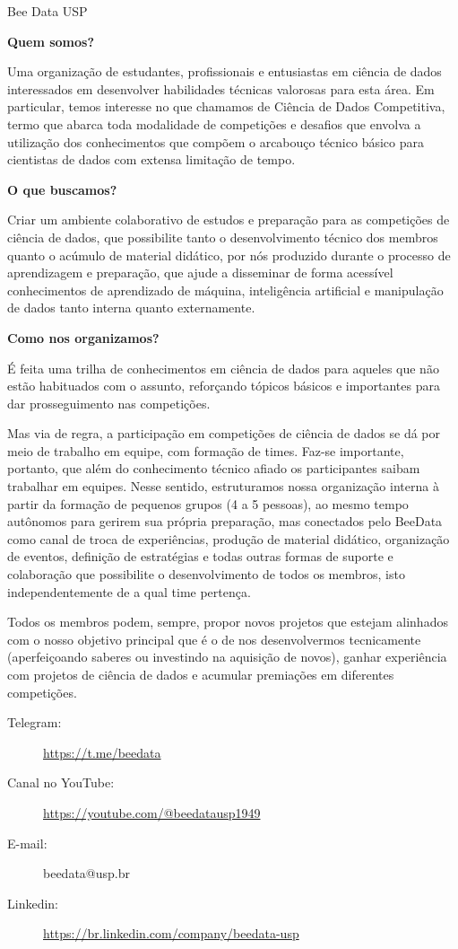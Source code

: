 \begin{subsecao}{Bee Data USP}


\textbf{Quem somos?}

Uma organização de estudantes, profissionais e entusiastas em ciência
de dados interessados em desenvolver habilidades técnicas valorosas para
esta área. Em particular, temos interesse no que chamamos de Ciência de
Dados Competitiva, termo que abarca toda modalidade de competições e desafios
que envolva a utilização dos conhecimentos que compõem o arcabouço técnico
básico para cientistas de dados com extensa limitação de tempo.

\textbf{O que buscamos?}

Criar um ambiente colaborativo de estudos e preparação para as competições de
ciência de dados, que possibilite tanto o desenvolvimento técnico dos membros
quanto o acúmulo de material didático, por nós produzido durante o processo de
aprendizagem e preparação, que ajude a disseminar de forma acessível conhecimentos
de aprendizado de máquina, inteligência artificial e manipulação de dados tanto
interna quanto externamente.

\textbf{Como nos organizamos?}

É feita uma trilha de conhecimentos em ciência de dados para aqueles que não
estão habituados com o assunto, reforçando tópicos básicos e importantes para dar
prosseguimento nas competições.

Mas via de regra, a participação em competições de ciência de dados se dá por meio
de trabalho em equipe, com formação de times. Faz-se importante, portanto, que
além do conhecimento técnico afiado os participantes saibam trabalhar em equipes.
Nesse sentido, estruturamos nossa organização interna à partir da formação de
pequenos grupos (4 a 5 pessoas), ao mesmo tempo autônomos para gerirem sua própria
preparação, mas conectados pelo BeeData como canal de troca de experiências, produção
de material didático, organização de eventos, definição de estratégias e todas outras
formas de suporte e colaboração que possibilite o desenvolvimento de todos os membros,
isto independentemente de a qual time pertença.

Todos os membros podem, sempre, propor novos projetos que estejam alinhados com
o nosso objetivo principal que é o de nos desenvolvermos tecnicamente (aperfeiçoando
saberes ou investindo na aquisição de novos), ganhar experiência com projetos de
ciência de dados e acumular premiações em diferentes competições.

\begin{description}
  \item[Telegram:] \url{https://t.me/beedata}
  \item[Canal no YouTube:] \url{https://youtube.com/@beedatausp1949}
  \item[E-mail:] beedata@usp.br
  \item[Linkedin:] \url{https://br.linkedin.com/company/beedata-usp}
\end{description}

\end{subsecao}
